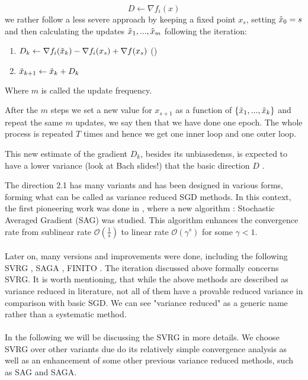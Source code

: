 \documentclass[12pt]{report}
\begin{document}
$$D\gets \nabla f_i(x)$$
we rather follow a less severe approach by keeping a fixed point $x_s$, setting $\Tilde{x}_0=s$ and then calculating the updates $\Tilde{x}_1,...,\Tilde{x}_m$ following the iteration:



\begin{enumerate} 
    \item  $D_k\gets \nabla f_i(\Tilde{x}_k)-\nabla f_i(x_s)+\nabla f(x_s)$ 
    \hfill{}(\theequation)

    \item $\Tilde{x}_{k+1}\gets \Tilde{x}_k + D_k$
\end{enumerate}




Where $m$ is called the update frequency.

After the $m$ steps we set a new value for $x_{s+1}$ as a function of $\{\Tilde{x}_1,...,\Tilde{x}_k\}$  and repeat the same $m$ updates, we say then that we have done one epoch. The whole process is repeated $T$ times and hence we get one inner loop and one outer loop.

This new estimate of the gradient $D_k$, besides its unbiasedenss, is expected to have a lower variance (look at Bach slides!) that the basic direction $D$ \cite{allen2017katyusha}.

The direction 2.1 has many variants and has been designed in various forms, forming what can be called as variance reduced SGD methods. In this context, the first pioneering work was done in \cite{schmidt2017minimizing}, where a new algorithm : Stochastic Averaged Gradient (SAG) was studied. This algorithm enhances the convergence rate from sublinear rate $\mathcal{O}(\frac{1}{s})$ to linear rate $\mathcal{O}(\gamma^s)$ for some $\gamma<1$. \\
\\Later on, many versions and improvements were done, including the following SVRG \cite{johnson2013accelerating}, SAGA \cite{defazio2014saga}, FINITO \cite{defazio2014finito}.
The iteration discussed above formally concerns SVRG.
It is worth mentioning, that while the above methods are described as variance reduced in literature, not all of them have a provable reduced variance in comparison with basic SGD. We can see "variance reduced" as a generic name rather than a systematic method. \\
\\In the following we will be discussing the SVRG in more details. We choose SVRG over other variants due do its relatively simple convergence analysis as well as an enhancement of some other previous variance reduced methods, such as SAG and SAGA.
\end{document}
